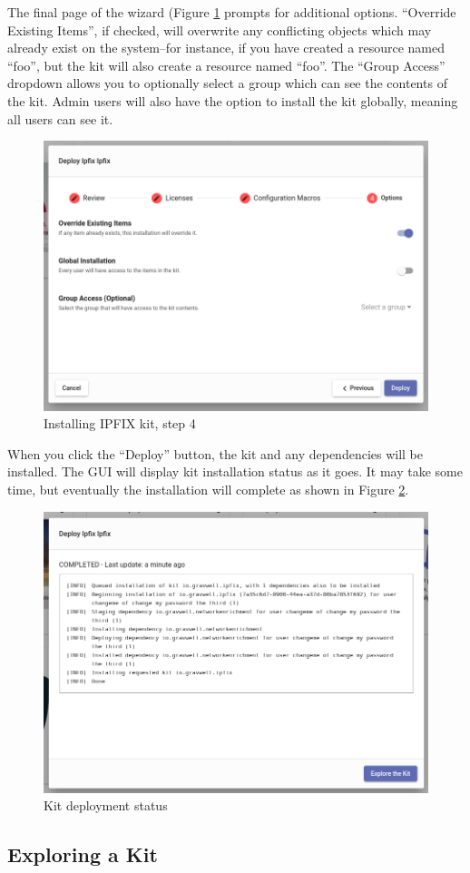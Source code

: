 The final page of the wizard (Figure \ref{fig:wizard4} prompts for additional options. ``Override Existing Items'', if checked, will overwrite any conflicting objects which may already exist on the system--for instance, if you have created a resource named ``foo'', but the kit will also create a resource named ``foo''. The ``Group Access'' dropdown allows you to optionally select a group which can see the contents of the kit. Admin users will also have the option to install the kit globally, meaning all users can see it.

\begin{figure}[H]
	\includegraphics[width=0.6\linewidth]{images/wizard4.png}
	\caption{Installing IPFIX kit, step 4}
	\label{fig:wizard4}
\end{figure}

When you click the ``Deploy'' button, the kit and any dependencies will be installed. The GUI will display kit installation status as it goes. It may take some time, but eventually the installation will complete as shown in Figure \ref{fig:install-done}.

\begin{figure}[H]
	\includegraphics[width=0.6\linewidth]{images/install-done.png}
	\caption{Kit deployment status}
	\label{fig:install-done}
\end{figure}

\subsection{Exploring a Kit}


